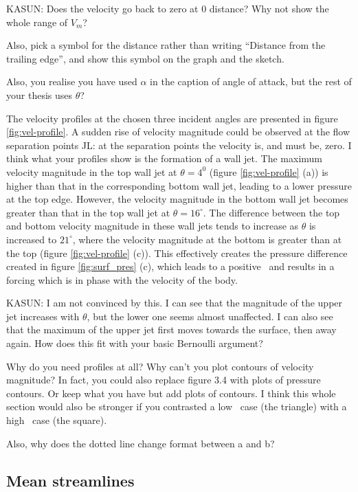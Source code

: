 

KASUN: Does the velocity go back to zero at 0 distance? Why not show
the whole range of $V_m$?

Also, pick a symbol for the distance rather than writing ``Distance
from the trailing edge'', and show this symbol on the graph and the
sketch.

Also, you realise you have used $\alpha$ in the caption of angle of
attack, but the rest of your thesis uses $\theta$?

The velocity profiles at the chosen three incident angles are presented in figure \ref{fig:vel-profile}. A sudden rise of velocity magnitude could be observed at the flow separation points JL: at the separation points the velocity is, and must be, zero. I think what your profiles show is the formation of a wall jet. The maximum velocity magnitude in the top wall jet at $\theta= 4^{0}$ (figure \ref{fig:vel-profile} (a)) is higher than that in the corresponding bottom wall jet, leading to a lower pressure at the top edge. However, the velocity magnitude in the bottom wall jet becomes greater than that in the top wall jet at $\theta=16^{\circ}$. The difference between the top and bottom velocity magnitude in these wall jets tends to increase as $\theta$ is increased to $21^{\circ}$, where the velocity magnitude at the bottom is greater than at the top (figure \ref{fig:vel-profile} (c)). This effectively creates the pressure difference created in figure \ref{fig:surf_pres} (c), which leads to a positive \cy\ and results in a forcing which is in phase with the velocity of the body. 

KASUN: I am not convinced by this. I can see that the magnitude of the upper jet increases with $\theta$, but the lower one seems almost unaffected. I can also see that the maximum of the upper jet first moves towards the surface, then away again. How does this fit with your basic Bernoulli argument?

Why do you need profiles at all? Why can't you plot contours of velocity magnitude? In fact, you could also replace figure 3.4 with plots of pressure contours. Or keep what you have but add plots of contours. I think this whole section would also be stronger if you contrasted a low \ratio\ case (the triangle) with a high \ratio\ case (the square).

Also, why does the dotted line change format between a and b?


\subsection{Mean streamlines}

